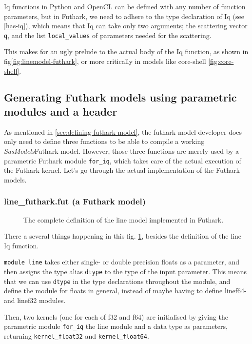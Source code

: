 \documentclass[11pt]{article}
\newcommand{\sasmodels}{\textit{SasModels}}
\begin{document}
Iq functions in Python and OpenCL can be defined with any number of function 
parameters, but in Futhark, we need to adhere to the type declaration of Iq 
(see \ref{has-iq}), which means that Iq can take only two arguments; the 
scattering vector \texttt{q}, and the list \texttt{local\_values} of parameters
needed for the scattering.

This makes for an ugly prelude to the actual body of the Iq function, as shown
in fig\ref{fig:linemodel-futhark}, or more critically in models like 
core-shell \ref{fig:core-shell}.


\subsection{Generating Futhark models using parametric modules and a header}
\label{sec:generating-futhark}
As mentioned in \ref{sec:defining-futhark-model}, the futhark model developer
does only need to define three functions to be able to compile a working 
\sasmodels Futhark model.
However, those three functions are merely used by a parametric Futhark module 
\texttt{for\_iq}, which takes care of the actual execution of the 
Futhark kernel.
Let's go through the actual implementation of the Futhark models.

\subsubsection{line\_futhark.fut (a Futhark model)}
\label{sec:line-fut}

\begin{figure}
  
  \caption{The complete definition of the line model implemented in Futhark.}
  \label{fig:linemodel-futhark-full}
\end{figure}

There a several things happening in this fig. \ref{fig:linemodel-futhark-full}, besides the 
definition of the line Iq function.

\texttt{module line} takes either single- or double precision floats as a
parameter, and then assigns the type alias \texttt{dtype} to the type of the
input parameter. This means that we can use \texttt{dtype} in the type
declarations throughout the module, and define the module for floats in general,
instead of maybe having to define linef64- and linef32 modules.

Then, two kernels (one for each of f32 and f64) are initialised by giving
the parametric module \texttt{for\_iq} the line module and a data type 
as parameters, returning \texttt{kernel\_float32} and \texttt{kernel\_float64}.
\end{document}
